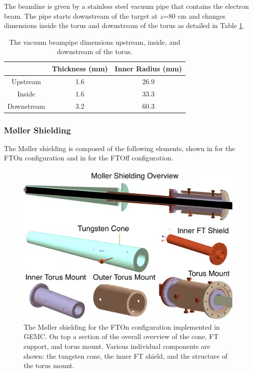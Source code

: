The beamline is given by a stainless steel vacuum pipe that contains the electron beam.
The pipe starts downstream of the target at $z$=80 cm and changes dimensions inside
the torus and downstream of the torus as detailed in Table \ref{tab:beampipe}.

\begin{table}[h]
	\begin{center}
		\begin{tabular}{| c | c | c |}
			\hline \hline
			                & Thickness (mm) & Inner Radius (mm)   \\
			\hline
              Upstream      &    1.6     &    26.9 \\
              Inside        &    1.6     &    33.3 \\
            Downstream      &    3.2     &    60.3 \\
			\hline \hline
		\end{tabular}
	\end{center}
	\caption{The vacuum beampipe dimensions upstream, inside, and downstream of the torus.}\label{tab:beampipe}
\end{table}


\subsubsection{M\o ller Shielding}
The M\o ller shielding is composed of the following elements, shown in  for the FTOn configuration
and in  for the FTOff configuration.

\begin{figure}
	\centering
	\includegraphics[width=0.99\columnwidth,keepaspectratio]{img/moellerShieldingFTOn.png}
	\caption{The M\o ller shielding for the FTOn configuration implemented in GEMC. On top a section of the overall overview of the cone, FT support, and torus mount.
		     Various individual components are shown: the tungsten cone, the inner FT shield, and the structure of the torus mount.}
	\label{fig:moellerShieldingFTOn}
\end{figure}

